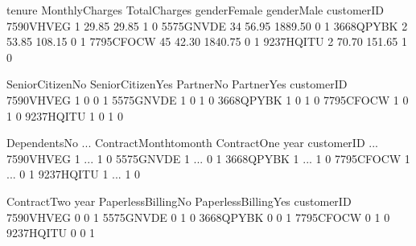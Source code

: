 \documentclass[letterpaper,10pt,english]{jupyterBook}
\begin{document}
\begin{sphinxVerbatim}[commandchars=\\\{\}]
            tenure  MonthlyCharges  TotalCharges  gender\PYGZus{}Female  gender\PYGZus{}Male  \PYGZbs{}
customerID                                                                     
7590\PYGZhy{}VHVEG       1           29.85         29.85              1            0   
5575\PYGZhy{}GNVDE      34           56.95       1889.50              0            1   
3668\PYGZhy{}QPYBK       2           53.85        108.15              0            1   
7795\PYGZhy{}CFOCW      45           42.30       1840.75              0            1   
9237\PYGZhy{}HQITU       2           70.70        151.65              1            0   

            SeniorCitizen\PYGZus{}No  SeniorCitizen\PYGZus{}Yes  Partner\PYGZus{}No  Partner\PYGZus{}Yes  \PYGZbs{}
customerID                                                                 
7590\PYGZhy{}VHVEG                 1                  0           0            1   
5575\PYGZhy{}GNVDE                 1                  0           1            0   
3668\PYGZhy{}QPYBK                 1                  0           1            0   
7795\PYGZhy{}CFOCW                 1                  0           1            0   
9237\PYGZhy{}HQITU                 1                  0           1            0   

            Dependents\PYGZus{}No  ...  Contract\PYGZus{}Month\PYGZhy{}to\PYGZhy{}month  Contract\PYGZus{}One year  \PYGZbs{}
customerID                 ...                                               
7590\PYGZhy{}VHVEG              1  ...                        1                  0   
5575\PYGZhy{}GNVDE              1  ...                        0                  1   
3668\PYGZhy{}QPYBK              1  ...                        1                  0   
7795\PYGZhy{}CFOCW              1  ...                        0                  1   
9237\PYGZhy{}HQITU              1  ...                        1                  0   

            Contract\PYGZus{}Two year  PaperlessBilling\PYGZus{}No  PaperlessBilling\PYGZus{}Yes  \PYGZbs{}
customerID                                                                 
7590\PYGZhy{}VHVEG                  0                    0                     1   
5575\PYGZhy{}GNVDE                  0                    1                     0   
3668\PYGZhy{}QPYBK                  0                    0                     1   
7795\PYGZhy{}CFOCW                  0                    1                     0   
9237\PYGZhy{}HQITU                  0                    0                     1   


\end{sphinxVerbatim}
\end{document}
